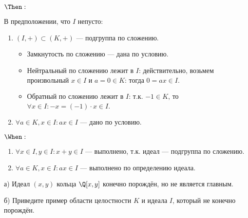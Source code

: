 \begin{solution}

\(\Then:\)

В предположении, что $I$ непусто:

\begin{enumerate}

\item $(I, +) \subset (K, +)$ --- подгруппа по сложению. 
	
	\begin{itemize}
	
	\item Замкнутость по сложению --- дана по условию.
	
	\item Нейтральный по сложению лежит в $I$: действительно, возьмем произвольный $x \in I$ и $a = 0 \in K$: тогда $0 = ax \in I$.
	
	\item Обратный по сложению лежит в $I$: т.к. $-1 \in K$, то $\forall x \in I: -x = (-1) \cdot x \in I$.
				
	\end{itemize}

\item $\forall a \in K, x \in I: ax \in I$ --- дано по условию.

\end{enumerate}

\(\When:\)

\begin{enumerate}
	
	\item $\forall x \in I, y \in I: x + y \in I$ --- выполнено, т.к. идеал --- подгруппа по сложению.
	
	\item $\forall a \in K, x \in I: ax \in I$ --- выполнено по определению идеала.
	
\end{enumerate}


\end{solution}


\begin{problem}[16 (3.17)]

а) Идеал $(x, y)$ кольца $\Q[x, y]$ конечно порождён, но не является главным.

б) Приведите пример области целостности $K$ и идеала $I$, который не конечно порождён.

\end{problem}

